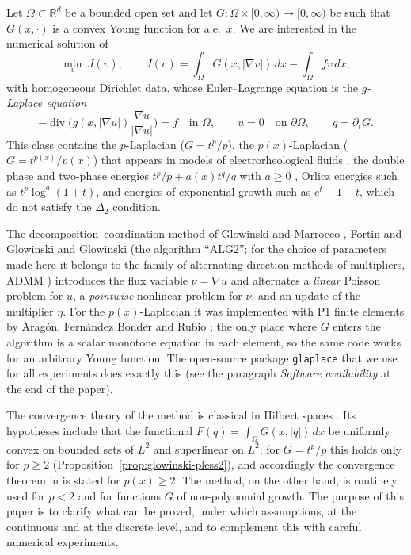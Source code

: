 \documentclass[11pt]{amsart}
\theoremstyle{definition}
\theoremstyle{remark}
\numberwithin{equation}{section}
\newcommand{\R}{\mathbb{R}}
\newcommand{\dx}{\,dx}
\newcommand{\abs}[1]{\lvert #1\rvert}
\DeclareMathOperator{\divg}{div}
\begin{document}
Let $\Omega\subset\R^d$ be a bounded open set and let $G\colon\Omega\times[0,\infty)\to[0,\infty)$ be such that $G(x,\cdot)$ is a convex Young function for a.e.\ $x$. We are interested in the numerical solution of
\begin{equation}\label{eq:P}
\min_{v}\ J(v),\qquad J(v)=\int_\Omega G(x,\abs{\nabla v})\dx-\int_\Omega fv\dx,
\end{equation}
with homogeneous Dirichlet data, whose Euler--Lagrange equation is the \emph{$g$-Laplace equation}
\begin{equation}\label{eq:EL}
-\divg\Big(g(x,\abs{\nabla u})\frac{\nabla u}{\abs{\nabla u}}\Big)=f\quad\text{in }\Omega,\qquad u=0\quad\text{on }\partial\Omega,\qquad g=\partial_tG .
\end{equation}
This class contains the $p$-Laplacian ($G=t^p/p$), the $p(x)$-Laplacian ($G=t^{p(x)}/p(x)$) that appears in models of electrorheological fluids \cite{AcerbiMingione2002}, the double phase and two-phase energies $t^p/p+a(x)t^q/q$ with $a\ge0$ \cite{Zhikov1986,ColomboMingione2015a}, Orlicz energies such as $t^p\log^a(1+t)$, and energies of exponential growth such as $e^t-1-t$, which do not satisfy the $\Delta_2$ condition.

The decomposition--coordination method of Glowinski and Marrocco \cite{GlowinskiMarrocco1975}, Fortin and Glowinski \cite{FortinGlowinski1983,FortinGlowinski1983ChIII} and Glowinski \cite{Glowinski1984ChVI} (the algorithm ``ALG2''; for the choice of parameters made here it belongs to the family of alternating direction methods of multipliers, ADMM \cite{GlowinskiPanTai2016,Boyd2011ADMM}) introduces the flux variable $\nu=\nabla u$ and alternates a \emph{linear} Poisson problem for $u$, a \emph{pointwise} nonlinear problem for $\nu$, and an update of the multiplier $\eta$. For the $p(x)$-Laplacian it was implemented with P1 finite elements by Arag\'on, Fern\'andez Bonder and Rubio \cite{AragonFBRubio2023}; the only place where $G$ enters the algorithm is a scalar monotone equation in each element, so the same code works for an arbitrary Young function. The open-source package \texttt{glaplace} that we use for all experiments does exactly this (see the paragraph \emph{Software availability} at the end of the paper).

The convergence theory of the method is classical in Hilbert spaces \cite{Glowinski1984ChVI,FortinGlowinski1983,GlowinskiPanTai2016}. Its hypotheses include that the functional $F(q)=\int_\Omega G(x,\abs q)\dx$ be uniformly convex on bounded sets of $L^2$ and superlinear on $L^2$; for $G=t^p/p$ this holds only for $p\ge2$ (Proposition~\ref{prop:glowinski-pless2}), and accordingly the convergence theorem in \cite{AragonFBRubio2023} is stated for $p(x)\ge2$. The method, on the other hand, is routinely used for $p<2$ and for functions $G$ of non-polynomial growth. The purpose of this paper is to clarify what can be proved, under which assumptions, at the continuous and at the discrete level, and to complement this with careful numerical experiments.
\end{document}
